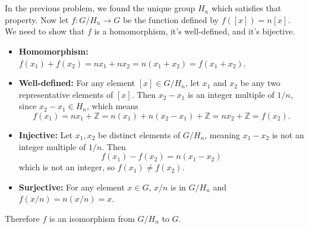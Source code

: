 \documentclass[12pt]{article}
\begin{document}
\section{}
\noindent{}\bigskip

In the previous problem, we found the unique group $H_n$ which satisfies that property. Now let $f: G/H_n \rightarrow G$ be the function defined by $f([x]) = n[x]$. We need to show that $f$ is a homomorphism, it's well-defined, and it's bijective.
\begin{itemize}
    \item \textbf{Homomorphism:} $f(x_1) + f(x_2) = nx_1 + nx_2 = n(x_1+x_2) = f(x_1+x_2)$.
    \item \textbf{Well-defined:} For any element $[x] \in G / H_n$, let $x_1$ and $x_2$ be any two representative elements of $[x]$. Then $x_2-x_1$ is an integer multiple of $1/n$, since $x_2-x_1 \in H_n$, which means
        \[ f(x_1) = nx_1 + \mathbb{Z} = n(x_1) + n(x_2-x_1) + \mathbb{Z} = nx_2 + \mathbb{Z} = f(x_2). \]
    \item \textbf{Injective:} Let $x_1, x_2$ be distinct elements of $G/H_n$, meaning $x_1-x_2$ is not an integer multiple of $1/n$. Then
        \[ f(x_1) - f(x_2) = n(x_1-x_2) \]
        which is not an integer, so $f(x_1) \neq f(x_2)$.
    \item \textbf{Surjective:} For any element $x \in G$, $x/n$ is in $G/H_n$ and $f(x/n) = n(x/n) = x$.
\end{itemize}
Therefore $f$ is an isomorphism from $G/H_n$ to $G$.

\section{}
\noindent{}\bigskip
\end{document}
